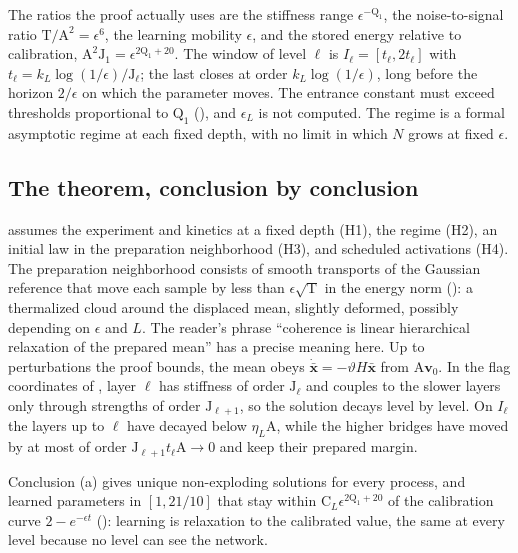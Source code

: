 The ratios the proof actually uses are the stiffness range \(\epsilon^{-\mathrm Q_1}\), the noise-to-signal
ratio \(\mathrm T/\mathrm A^2=\epsilon^6\), the learning mobility \(\epsilon\), and the stored energy relative to
calibration, \(\mathrm A^2\mathrm J_1=\epsilon^{2\mathrm Q_1+20}\). The window of level \(\ell\) is
\(I_\ell=[t_\ell,2t_\ell]\) with \(t_\ell=k_L\log(1/\epsilon)/\mathrm J_\ell\); the last closes at order
\(k_L\log(1/\epsilon)\), long before the horizon \(2/\epsilon\) on which the parameter moves. The entrance
constant must exceed thresholds proportional to \(\mathrm Q_1\) (), and
\(\epsilon_L\) is not computed. The regime is a formal asymptotic regime at each fixed depth, with no limit in
which \(N\) grows at fixed \(\epsilon\).

\subsection{The theorem, conclusion by conclusion}
\label{comp:ch13-theorem}

 assumes the experiment and kinetics at a fixed depth (H1), the
regime (H2), an initial law in the preparation neighborhood (H3), and scheduled activations (H4). The
preparation neighborhood consists of smooth transports of the Gaussian reference that move each sample by
less than \(\epsilon\sqrt{\mathrm T}\) in the energy norm (): a
thermalized cloud around the displaced mean, slightly deformed, possibly depending on \(\epsilon\) and
\(L\). The reader's phrase ``coherence is linear hierarchical relaxation of the prepared mean'' has a
precise meaning here. Up to perturbations the proof bounds, the mean obeys
\(\dot{\bar{\mathbf x}}=-\vartheta H\bar{\mathbf x}\) from \(\mathrm A\mathbf v_0\). In the flag coordinates of
, layer \(\ell\) has stiffness of order \(\mathrm J_\ell\) and couples to the
slower layers only through strengths of order \(\mathrm J_{\ell+1}\), so the solution decays level by level. On \(I_\ell\) the layers up to \(\ell\) have decayed
below \(\eta_L\mathrm A\), while the higher bridges have moved by at most of order
\(\mathrm J_{\ell+1}t_\ell\mathrm A\to0\) and keep their prepared margin.

Conclusion (a) gives unique non-exploding solutions for every process, and learned parameters in
\([1,21/10]\) that stay within \(\mathrm C_L\epsilon^{2\mathrm Q_1+20}\) of the calibration curve
\(2-e^{-\epsilon t}\) (): learning is relaxation to the calibrated value,
the same at every level because no level can see the network.

